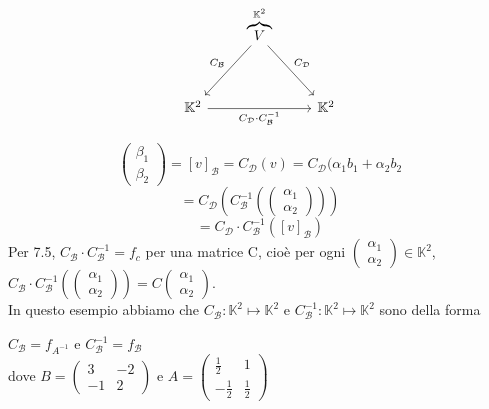 \documentclass[12pt]{article}
\begin{document}
\begin{equation*}
\begin{tikzcd}[row sep=huge]
 &
\overbrace{V}^{\mathbb{K}^2} \arrow[dl,swap, "C_{\mathcal{B}}"] \arrow[dr,"C_{\mathcal{D}}"] &
\\
\mathbb{K}^2  \arrow[rr, swap, "C_{\mathcal{D}} \cdot C_{\mathcal{B}}^{-1}"] & & \mathbb{K}^2
\end{tikzcd}
\end{equation*}


\[\begin{pmatrix}
    \beta_1\\
    \beta_2
\end{pmatrix} = [v]_{\mathcal{B}} = C_{\mathcal{D}}(v) = C_{\mathcal{D}}(\alpha_1b_1 + \alpha_2b_2\]
\[= C_{\mathcal{D}}\left(C_{\mathcal{B}}^{-1}\left(\begin{pmatrix}
    \alpha_1\\
    \alpha_2
\end{pmatrix}\right)\right)\]
\[= C_{\mathcal{D}} \cdot C_{\mathcal{B}}^{-1}([v]_{\mathcal{B}})\]
Per 7.5, $C_{\mathcal{B}} \cdot C_{\mathcal{B}}^{-1} = f_c$ per una matrice C, cioè per ogni $\begin{pmatrix}
    \alpha_1\\
    \alpha_2
\end{pmatrix} \in \mathbb{K}^2$,
$C_{\mathcal{B}} \cdot  C_{\mathcal{B}}^{-1}\left(\begin{pmatrix}
    \alpha_1\\
    \alpha_2
\end{pmatrix}\right) = C\begin{pmatrix}
    \alpha_1\\
    \alpha_2
\end{pmatrix}$.\\
In questo esempio abbiamo che $C_{\mathcal{B}}: \mathbb{K}^2 \mapsto \mathbb{K}^2$ e $C_{\mathcal{B}}^{-1}: \mathbb{K}^2 \mapsto \mathbb{K}^2$ sono della forma
\begin{center}
$C_{\mathcal{B}} = f_{A^{-1}}$ e $C_{\mathcal{B}}^{-1} = f_{\mathcal{B}}$
\\
dove
$B = \begin{pmatrix}
    3 & -2\\
    -1 & 2
\end{pmatrix}$ e $A = \begin{pmatrix}
    \frac{1}{2} & 1\\
    -\frac{1}{2} & \frac{1}{2}
\end{pmatrix}$
\end{center}
\end{document}
